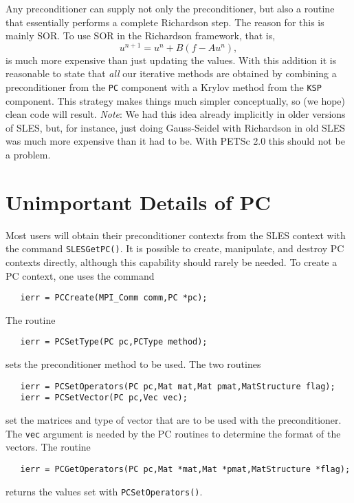 Any preconditioner can supply not 
only the preconditioner, but also a routine that essentially performs a
complete Richardson step. The reason for this is mainly SOR. To 
use SOR in the Richardson framework, that is,
\[
  u^{n+1} = u^{n} + B(f - A u^{n}), 
\]
is much more expensive than just updating the values.
With this addition it is reasonable to state that {\em all} our
iterative methods are obtained by combining a preconditioner from 
the {\tt PC} component with a Krylov method from the {\tt KSP}
component. This strategy makes things much simpler conceptually, so 
(we hope)
clean code will result. {\em Note}: We had this idea already implicitly in 
older versions of SLES, but, for instance, just doing Gauss-Seidel
with Richardson in old SLES was much more expensive than it had to be. 
With PETSc 2.0 this should not be a problem. 

\section{Unimportant Details of PC}

Most users will obtain their preconditioner contexts from the SLES
context with the command {\tt SLESGetPC()}. It is possible to create,
manipulate, and destroy PC contexts directly, although this capability
should rarely be needed. To create a PC context, one uses the command
\begin{verbatim}
   ierr = PCCreate(MPI_Comm comm,PC *pc);
\end{verbatim}
The routine 
\begin{verbatim}
   ierr = PCSetType(PC pc,PCType method);
\end{verbatim}
sets the preconditioner method to be used. 
The two routines  
\begin{verbatim}
   ierr = PCSetOperators(PC pc,Mat mat,Mat pmat,MatStructure flag);
   ierr = PCSetVector(PC pc,Vec vec);
\end{verbatim}
set the matrices and type of vector that are to be used with 
the preconditioner.  The {\tt vec} argument is needed by the PC routines 
to determine the format of the vectors. 
The routine 
\begin{verbatim}
   ierr = PCGetOperators(PC pc,Mat *mat,Mat *pmat,MatStructure *flag);
\end{verbatim}
returns the values set with {\tt PCSetOperators()}.

